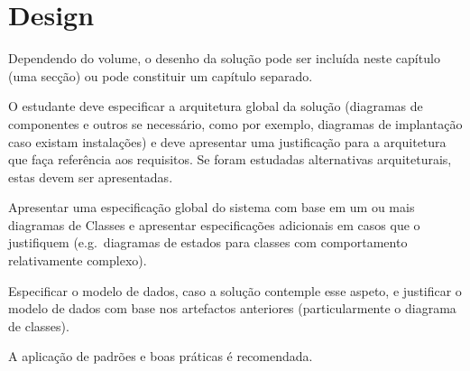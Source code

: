 \section{Design} %
\label{sec:design}

Dependendo do volume, o desenho da solução pode ser incluída neste capítulo (uma secção) ou pode constituir um capítulo separado.

O estudante deve especificar a arquitetura global da solução (diagramas de componentes e outros se necessário, como por exemplo, diagramas de implantação caso existam instalações) e deve apresentar uma justificação para a arquitetura que faça referência aos requisitos. Se foram estudadas alternativas arquiteturais, estas devem ser apresentadas.

Apresentar uma especificação global do sistema com base em um ou mais diagramas de Classes e apresentar especificações adicionais em casos que o justifiquem (e.g.\ diagramas de estados para classes com comportamento relativamente complexo).

Especificar o modelo de dados, caso a solução contemple esse aspeto, e justificar o modelo de dados com base nos artefactos anteriores (particularmente o diagrama de classes).

A aplicação de padrões e boas práticas é recomendada.

